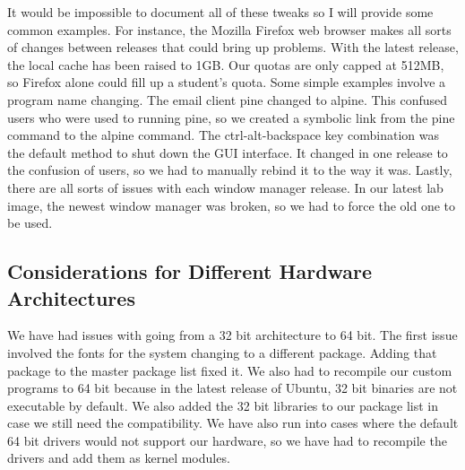 It would be impossible to document all of these tweaks so I will provide some common examples.  For instance, the Mozilla Firefox web browser makes all sorts of changes between releases that could bring up problems.  With the latest release, the local cache has been raised to 1GB.  Our quotas are only capped at 512MB, so Firefox alone could fill up a student's quota.  Some simple examples involve a program name changing.  The email client pine changed to alpine.  This confused users who were used to running pine, so we created a symbolic link from the pine command to the alpine command.  The ctrl-alt-backspace key combination was the default method to shut down the GUI interface.  It changed in one release to the confusion of users, so we had to manually rebind it to the way it was.  Lastly, there are all sorts of issues with each window manager release.  In our latest lab image, the newest window manager was broken, so we had to force the old one to be used.  

\subsection{Considerations for Different Hardware Architectures} 
We have had issues with going from a 32 bit architecture to 64 bit.  The first issue involved the fonts for the system changing to a different package.  Adding that package to the master package list fixed it.  We also had to recompile our custom programs to 64 bit because in the latest release of Ubuntu, 32 bit binaries are not executable by default.  We also added the 32 bit libraries to our package list in case we still need the compatibility.  We have also run into cases where the default 64 bit drivers would not support our hardware, so we have had to recompile the drivers and add them as kernel modules.  
